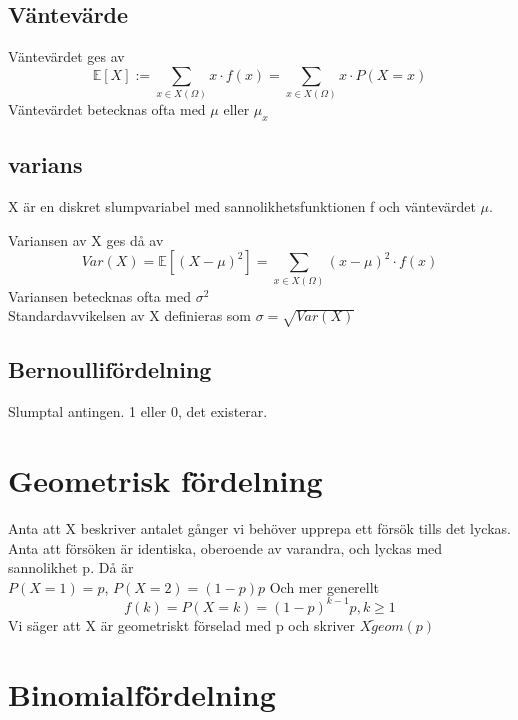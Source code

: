 \subsection{Väntevärde}
Väntevärdet ges av
$$
\mathbb{E}\left[ X \right]:=\sum_{x\in X(\Omega)}x\cdot f(x)=\sum_{x\in X(\Omega)}x\cdot P(X=x)
$$
Väntevärdet betecknas ofta med $\mu$ eller $\mu_x$
\subsection{varians}
X är en diskret slumpvariabel med sannolikhetsfunktionen f och väntevärdet $\mu$.

Variansen av X ges då av $$
Var(X)=\mathbb{E}\left[(X-\mu)^2\right]=\sum_{x\in X(\Omega)}(x-\mu)^2\cdot f(x)
$$
Variansen betecknas ofta med $\sigma^2$\\
Standardavvikelsen av X definieras som $\sigma=\sqrt{Var(X)}$

\subsection{Bernoullifördelning}
Slumptal antingen. 1 eller 0, det existerar.

\section{Geometrisk fördelning}
Anta att X beskriver antalet gånger vi behöver upprepa ett försök tills det lyckas. Anta att försöken är identiska, oberoende av varandra, och lyckas med sannolikhet p. Då är \\
$P(X=1)=p$, $P(X=2)=(1-p)p$ Och mer generellt
$$
f(k)=P(X=k)=(1-p)^{k-1}p, k\geq1
$$
Vi säger att X är geometriskt förselad med p och skriver $X\tilde geom(p)$
\section{Binomialfördelning}
